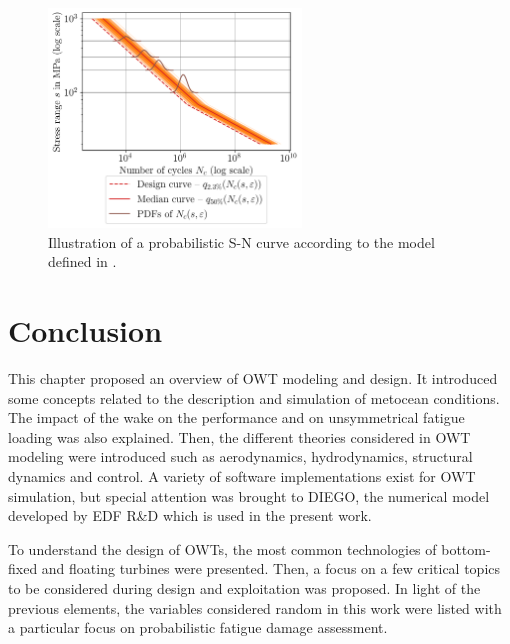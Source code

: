 \begin{figure}
    \centering
    \includegraphics[width=0.6\textwidth]{../numerical_experiments/chapter2/figures/probabilistic_fatigue.png}
    \caption{Illustration of a probabilistic S-N curve according to the model defined in \citet{guede_2007}.}
    \label{fig:probabilistic_SN}
\end{figure}


\section{Conclusion}

This chapter proposed an overview of OWT modeling and design. 
It introduced some concepts related to the description and simulation of metocean conditions. 
The impact of the wake on the performance and on unsymmetrical fatigue loading was also explained.  
Then, the different theories considered in OWT modeling were introduced such as aerodynamics, hydrodynamics, structural dynamics and control. 
A variety of software implementations exist for OWT simulation, but special attention was brought to DIEGO, the numerical model developed by EDF R\&D which is used in the present work. 

To understand the design of OWTs, the most common technologies of bottom-fixed and floating turbines were presented. 
Then, a focus on a few critical topics to be considered during design and exploitation was proposed. 
In light of the previous elements, the variables considered random in this work were listed with a particular focus on probabilistic fatigue damage assessment.   

